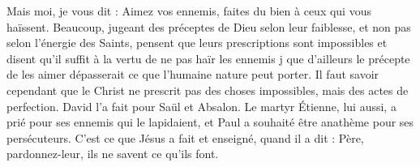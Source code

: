 Mais moi, je vous dit : Aimez vos ennemis, faites du bien à ceux qui vous haïssent. Beaucoup, jugeant des préceptes de Dieu selon leur faiblesse, et non pas selon l’énergie des Saints, pensent que leurs prescriptions sont impossibles et disent qu’il suffit à la vertu de ne pas haïr les ennemis j que d’ailleurs le précepte de les aimer dépasserait ce que l’humaine nature peut porter. Il faut savoir cependant que le Christ ne prescrit pas des choses impossibles, mais des actes de perfection. David l’a fait pour Saül et Absalon. Le martyr Étienne, lui aussi, a prié pour ses ennemis qui le lapidaient, et Paul a souhaité être anathème pour ses persécuteurs. C’est ce que Jésus a fait et enseigné, quand il a dit : Père, pardonnez-leur, ils ne savent ce qu'ils font.
